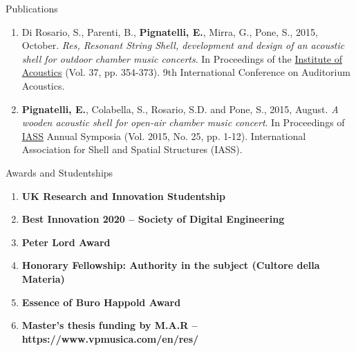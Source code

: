 \documentclass{resume}
\begin{document}
\begin{rSection}{Publications}
\begin{enumerate}[leftmargin=0.45cm, itemsep=0em, topsep=0.5em, parsep=0.2em]
        \item Di Rosario, S., Parenti, B., \textbf{Pignatelli, E.}, Mirra, G., Pone, S., 2015, October. \textit{Res, Resonant String Shell, development and design of an acoustic shell for outdoor chamber music concerts}. In Proceedings of the \underline{Institute of Acoustics} (Vol. 37, pp. 354-373). 9th International Conference on Auditorium Acoustics.
        \item \textbf{Pignatelli, E.}, Colabella, S., Rosario, S.D. and Pone, S., 2015, August. \textit{A wooden acoustic shell for open-air chamber music concert}. In Proceedings of \underline{IASS} Annual Symposia (Vol. 2015, No. 25, pp. 1-12). International Association for Shell and Spatial Structures (IASS).
    \end{enumerate}
    \end{rSection}

    \clearpage
    \begin{rSection}{Awards and Studentships}
    \begin{enumerate}[leftmargin=0.45cm, itemsep=0em, topsep=0.5em, parsep=0.2em]
        \item
        \textbf{UK Research and Innovation Studentship}
        \item
        \textbf{Best Innovation 2020 – Society of Digital Engineering}
        \item
        \textbf{Peter Lord Award}
        \item
        \textbf{Honorary Fellowship: Authority in the subject (Cultore della Materia)}
        \item
        \textbf{Essence of Buro Happold Award}
        \item
        \textbf{Master’s thesis funding by M.A.R – https://www.vpmusica.com/en/res/}
    \end{enumerate}
\end{rSection}
\end{document}
